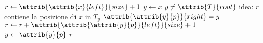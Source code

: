 \begin{codebox}
\li $r \gets \attrib{\attrib{x}{left}}{size} + 1$
\li $y \gets x$
\li \While $y \neq \attrib{T}{root}$
    	\Comment idea: $r$ contiene la posizione di $x$ in $T_y$
\li \Do
        \If $\attrib{\attrib{y}{p}}{right} = y$
\li     \Then
            $r \gets r + \attrib{\attrib{\attrib{y}{p}}{left}}{size} + 1$
        \End
\li     $y \gets \attrib{y}{p}$
    \End
\li \Return $r$
\end{codebox}